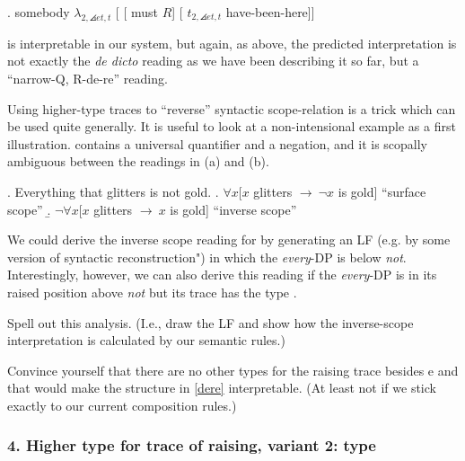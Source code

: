 \exi. somebody $\lambda_{2,\angles{et,t}}$ [ [ must $R$] [ $t_{2,\angles{et,t}}$ have-been-here]]

\Last is interpretable in our system, but again, as above, the predicted interpretation is not exactly the \emph{de dicto} reading as we have been describing it so far, but a ``narrow-Q, R-de-re'' reading.
\begin{exercise}
	
	Using higher-type traces to ``reverse'' syntactic scope-relation is a trick which can be used quite generally. It is useful to look at a non-intensional example as a first illustration. \Next contains a universal quantifier and a negation, and it is scopally ambiguous between the readings in (a) and (b).
	
	\ex. Everything that glitters is not gold. \a. $\forall x[ x$ glitters $\rightarrow\ \ensuremath{\neg} x$ is gold] \hfill``surface scope'' \b. $\ensuremath{\neg}\forall x[ x$ glitters $\rightarrow\ x$ is gold] \hfill``inverse scope''
	
	We could derive the inverse scope reading for \Last by generating an LF (e.g. by some version of syntactic reconstruction") in which the \emph{every}-DP is below \emph{not}. Interestingly, however, we can also derive this reading if the \emph{every}-DP is in its raised position above \emph{not} but its trace has the type .
	
	Spell out this analysis. (I.e., draw the LF and show how the inverse-scope interpretation is calculated by our semantic rules.) \eex 
\end{exercise}
\begin{exercise}
	
	Convince yourself that there are no other types for the raising trace besides e and  that would make the structure in \ref{dere} interpretable. (At least not if we stick exactly to our current composition rules.) \eex 
\end{exercise}

\subsubsection{4. Higher type for trace of raising, variant 2: type }

